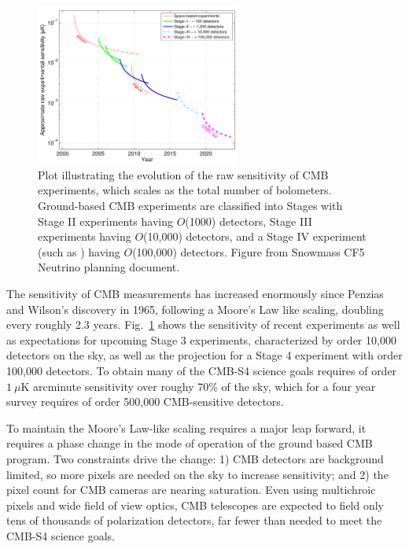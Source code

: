 \begin{figure}[t]
\centering \includegraphics[width=0.6\textwidth]{Intro/expt_progress.pdf}
\caption{Plot illustrating the evolution of the raw sensitivity of CMB
  experiments, which scales as the total number of
  bolometers. Ground-based CMB experiments are classified into Stages
  with Stage II experiments having $O$(1000) detectors, Stage III
  experiments having $O$(10,000) detectors, and a Stage IV experiment
  (such as \cmbexp) having $O$(100,000) detectors. Figure from Snowmass  CF5
  Neutrino planning document.}
\label{fig:expt_progress-intro}
\end{figure}

The sensitivity of CMB measurements has increased enormously since Penzias and Wilson's discovery in 1965, following a Moore's Law like scaling, doubling every roughly 2.3 years. Fig.~\ref{fig:expt_progress-intro} shows the sensitivity of recent experiments as well as expectations for upcoming Stage 3 experiments, characterized by order 10,000 detectors on the sky, as well as the projection for a Stage 4 experiment with order 100,000 detectors. To obtain many of the CMB-S4 science goals requires of order $1~\mu$K arcminute sensitivity over roughy 70\% of the sky, which for a four year survey requires of order 500,000 CMB-sensitive detectors. 

To maintain the Moore's Law-like scaling requires a major leap forward, it requires a phase change in the mode of operation of the ground based CMB program.  Two constraints drive the change:  1) CMB detectors are background limited, so more pixels are needed on the sky to increase sensitivity; and 2) the pixel count for CMB cameras are nearing saturation.  Even using multichroic pixels and wide field of view optics, CMB telescopes are expected to field only tens of thousands of polarization detectors, far fewer than needed to meet the CMB-S4 science goals. 

